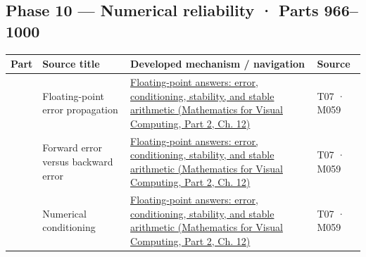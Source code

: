 \subsection{Phase 10 --- Numerical reliability · Parts 966--1000}\label{appendix-fd090d982a15-phase-10-numerical-reliability-parts-9661000}

\hypertarget{appendix-fd090d982a15-phase-10-numerical-reliability-parts-9661000}{}

{\def\LTcaptype{none} %
\begin{longtable}[]{@{}
  >{\raggedleft\arraybackslash}p{}
  >{\raggedright\arraybackslash}p{}
  >{\raggedright\arraybackslash}p{}
  >{\raggedright\arraybackslash}p{}@{}}
\toprule\noalign{}
\begin{minipage}[b]{\linewidth}\raggedleft
Part
\end{minipage} & \begin{minipage}[b]{\linewidth}\raggedright
Source title
\end{minipage} & \begin{minipage}[b]{\linewidth}\raggedright
Developed mechanism / navigation
\end{minipage} & \begin{minipage}[b]{\linewidth}\raggedright
Source
\end{minipage} \\
\midrule\noalign{}
\endhead
\bottomrule\noalign{}
\endlastfoot
966 & Floating-point error propagation & \href{../02-Mathematics-for-Visual-Computing-P02/main.pdf\#nameddest=02-foundations-ii-ch028-floating-point-answers-error-conditioning-stability-and-stable-arithmetic}{Floating-point answers: error, conditioning, stability, and stable arithmetic (Mathematics for Visual Computing, Part 2, Ch. 12)} & T07 · M059 \\
967 & Forward error versus backward error & \href{../02-Mathematics-for-Visual-Computing-P02/main.pdf\#nameddest=02-foundations-ii-ch028-floating-point-answers-error-conditioning-stability-and-stable-arithmetic}{Floating-point answers: error, conditioning, stability, and stable arithmetic (Mathematics for Visual Computing, Part 2, Ch. 12)} & T07 · M059 \\
968 & Numerical conditioning & \href{../02-Mathematics-for-Visual-Computing-P02/main.pdf\#nameddest=02-foundations-ii-ch028-floating-point-answers-error-conditioning-stability-and-stable-arithmetic}{Floating-point answers: error, conditioning, stability, and stable arithmetic (Mathematics for Visual Computing, Part 2, Ch. 12)} & T07 · M059 \\

\end{longtable}}
